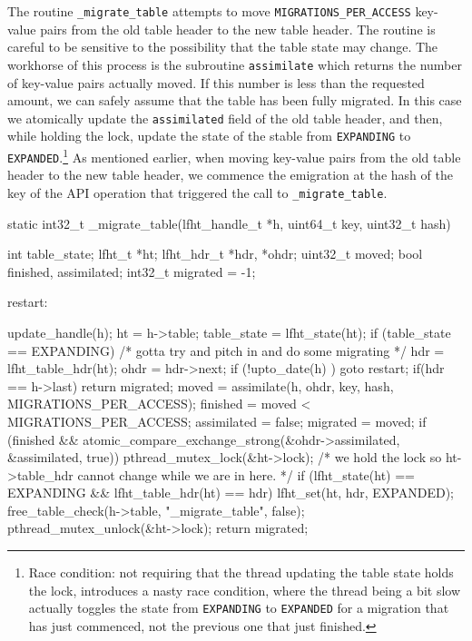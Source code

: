 The routine \texttt{\_migrate\_table} attempts to move \texttt{MIGRATIONS\_PER\_ACCESS} key-value
pairs from the old table header to the new table header. The routine is careful to be sensitive to
the possibility that the table state may change.
The workhorse of this process
is the subroutine  \texttt{assimilate} which returns the number of key-value pairs actually moved.
If this number is less than the requested amount, we can safely assume that the table has been
fully migrated. In this case we atomically update the \texttt{assimilated} field of the old table header,
and then, while holding the lock, update the state of the stable from \texttt{EXPANDING} to
\texttt{EXPANDED}.\footnote{Race condition: not requiring that the thread updating the
  table state holds the lock, introduces a nasty race condition, where the thread being a bit slow
  actually toggles the state from \texttt{EXPANDING} to \texttt{EXPANDED} for a migration that
  has just commenced, not the previous one that just finished.}
As mentioned earlier, when moving key-value pairs from the old table header to the new table header, we
commence the emigration at the hash of the key of the API operation that triggered the call to \texttt{\_migrate\_table}.




\begin{center}
\begin{clisting}
static int32_t _migrate_table(lfht_handle_t *h, uint64_t key, uint32_t hash){
  int table_state;
  lfht_t *ht;
  lfht_hdr_t *hdr, *ohdr;
  uint32_t moved;
  bool finished, assimilated;
  int32_t migrated = -1;
  
 restart:

  update_handle(h);
  ht = h->table;
  table_state = lfht_state(ht);
  if (table_state == EXPANDING){
    /* gotta try and pitch in and do some migrating */
    hdr = lfht_table_hdr(ht);
    ohdr = hdr->next;
    if (!upto_date(h) ){ goto restart; }
    if(hdr == h->last){ return migrated; }
    moved = assimilate(h, ohdr, key, hash,  MIGRATIONS_PER_ACCESS);
    finished = moved < MIGRATIONS_PER_ACCESS;
    assimilated = false;
    migrated = moved;
    if (finished  &&  atomic_compare_exchange_strong(&ohdr->assimilated, &assimilated, true)){
      pthread_mutex_lock(&ht->lock);
      /* we hold the lock so ht->table_hdr cannot change while we are in here. */
      if (lfht_state(ht) == EXPANDING  && lfht_table_hdr(ht) == hdr){
	lfht_set(ht, hdr, EXPANDED);
        free_table_check(h->table, "_migrate_table", false);
      }
      pthread_mutex_unlock(&ht->lock);
    }
  }
  return migrated;
}
\end{clisting}
\end{center}

